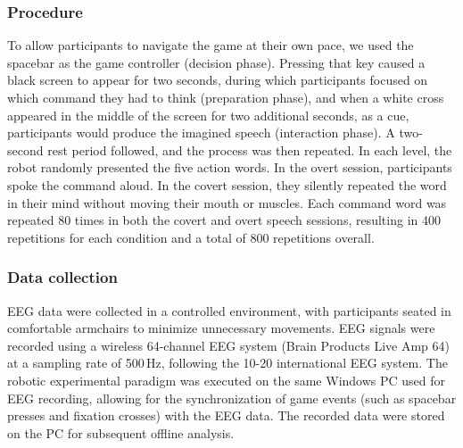 \documentclass[onecolumn]{IEEEtran}
\begin{document}
\subsubsection{Procedure}
To allow participants to navigate the game at their own pace, 
we used the spacebar as the game controller (decision phase). 
Pressing that key caused a black screen to appear for two seconds, 
during which participants focused on which command they had to think (preparation phase), 
and when a white cross appeared in the middle of the screen for two additional seconds, 
as a cue, participants would produce the imagined speech (interaction phase).
A two-second rest period followed, and the process was then repeated. 
In each level, the robot randomly presented the five action words. 
In the overt session, participants spoke the command aloud. 
In the covert session, they silently repeated the word in their mind without moving their mouth or muscles. 
Each command word was repeated 80 times in both the covert and overt speech sessions, 
resulting in 400 repetitions for each condition and a total of 800 repetitions overall.

\subsubsection{Data collection}
EEG data were collected in a controlled environment, 
with participants seated in comfortable armchairs to minimize unnecessary movements. 
EEG signals were recorded using a wireless 64-channel EEG system (Brain Products Live Amp 64) 
at a sampling rate of 500\,Hz, following the 10-20 international EEG system.
The robotic experimental paradigm was executed on the same Windows PC used for EEG recording, 
allowing for the synchronization of game events (such as spacebar presses and fixation crosses) with the EEG data. 
The recorded data were stored on the PC for subsequent offline analysis.
\end{document}
